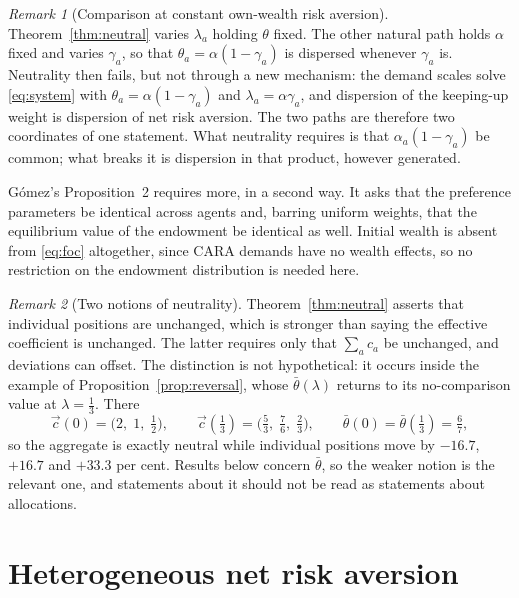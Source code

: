 \documentclass[12pt]{article}
\theoremstyle{definition}
\theoremstyle{remark}
\newtheorem{remark}{Remark}
\newcommand{\bth}{\bar\theta}
\begin{document}
\begin{remark}[Comparison at constant own-wealth risk aversion]
\label{rem:param}
Theorem~\ref{thm:neutral} varies $\lambda_a$ holding $\theta$ fixed. The other
natural path holds $\alpha$ fixed and varies $\gamma_a$, so that
$\theta_a=\alpha(1-\gamma_a)$ is dispersed whenever $\gamma_a$ is. Neutrality
then fails, but not through a new mechanism: the demand scales solve
\eqref{eq:system} with $\theta_a=\alpha(1-\gamma_a)$ and
$\lambda_a=\alpha\gamma_a$, and dispersion of the keeping-up weight is
dispersion of net risk aversion. The two paths are therefore two coordinates of
one statement. What neutrality requires is that $\alpha_a(1-\gamma_a)$ be
common; what breaks it is dispersion in that product, however generated.

Gómez's Proposition~2 requires more, in a second way. It asks that the
preference parameters be identical across agents and, barring uniform weights,
that the equilibrium value of the endowment be identical as well. Initial
wealth is absent from \eqref{eq:foc} altogether, since CARA demands have no
wealth effects, so no restriction on the endowment distribution is needed here.
\end{remark}

\begin{remark}[Two notions of neutrality]
\label{rem:two}
Theorem~\ref{thm:neutral} asserts that individual positions are unchanged,
which is stronger than saying the effective coefficient is unchanged. The latter
requires only that $\sum_ac_a$ be unchanged, and deviations can offset. The
distinction is not hypothetical: it occurs inside the example of
Proposition~\ref{prop:reversal}, whose $\bth(\lambda)$ returns to its
no-comparison value at $\lambda=\tfrac13$. There
%
\begin{equation*}
\vec c(0)=\big(2,\;1,\;\tfrac12\big),
\qquad
\vec c(\tfrac13)=\big(\tfrac53,\;\tfrac76,\;\tfrac23\big),
\qquad
\bth(0)=\bth(\tfrac13)=\tfrac67 ,
\end{equation*}
%
so the aggregate is exactly neutral while individual positions move by
$-16.7$, $+16.7$ and $+33.3$ per cent. Results below concern $\bth$, so the
weaker notion is the relevant one, and statements about it should not be read
as statements about allocations.
\end{remark}

\section{Heterogeneous net risk aversion}
\label{sec:hetero}
\end{document}
